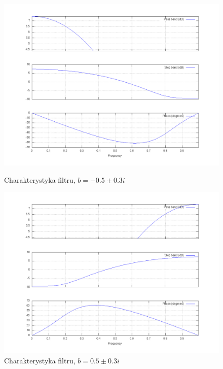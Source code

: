 \documentclass[wide,a4paper,titlepage,12pt]{mwart}
\begin{document}
  \begin{figure}[htbp]
    \begin{center}
      \includegraphics[scale=.3]{out/fig19.png}
      \caption{\label{fig19} Charakterystyka filtru, $b=-0.5\pm0.3i$}
      \includegraphics[scale=.3]{out/fig20.png}
      \caption{\label{fig20} Charakterystyka filtru, $b=0.5\pm0.3i$}

    \end{center}
  \end{figure}
\end{document}
